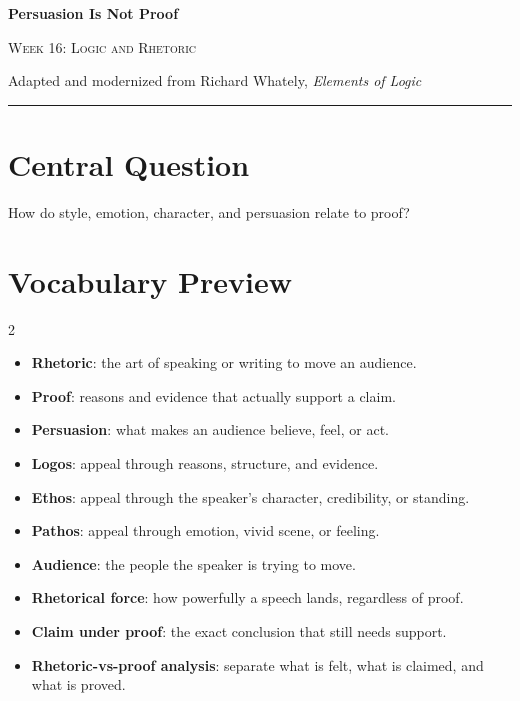 \documentclass[12pt]{article}
\begin{document}
\begin{center}
{\LARGE\bfseries Persuasion Is Not Proof}\par\vspace{0.25em}
{\large\scshape Week 16: Logic and Rhetoric}\par\vspace{0.5em}
{Adapted and modernized from Richard Whately, \textit{Elements of Logic}}\par\vspace{0.6em}
\rule{0.82\textwidth}{0.4pt}
\end{center}

\section*{Central Question}
How do style, emotion, character, and persuasion relate to proof?

\section*{Vocabulary Preview}
\begin{multicols}{2}
\begin{itemize}[leftmargin=*, itemsep=0.18em]
\item \textbf{Rhetoric}: the art of speaking or writing to move an audience.
\item \textbf{Proof}: reasons and evidence that actually support a claim.
\item \textbf{Persuasion}: what makes an audience believe, feel, or act.
\item \textbf{Logos}: appeal through reasons, structure, and evidence.
\item \textbf{Ethos}: appeal through the speaker's character, credibility, or standing.
\item \textbf{Pathos}: appeal through emotion, vivid scene, or feeling.
\item \textbf{Audience}: the people the speaker is trying to move.
\item \textbf{Rhetorical force}: how powerfully a speech lands, regardless of proof.
\item \textbf{Claim under proof}: the exact conclusion that still needs support.
\item \textbf{Rhetoric-vs-proof analysis}: separate what is felt, what is claimed, and what is proved.
\end{itemize}
\end{multicols}
\end{document}
